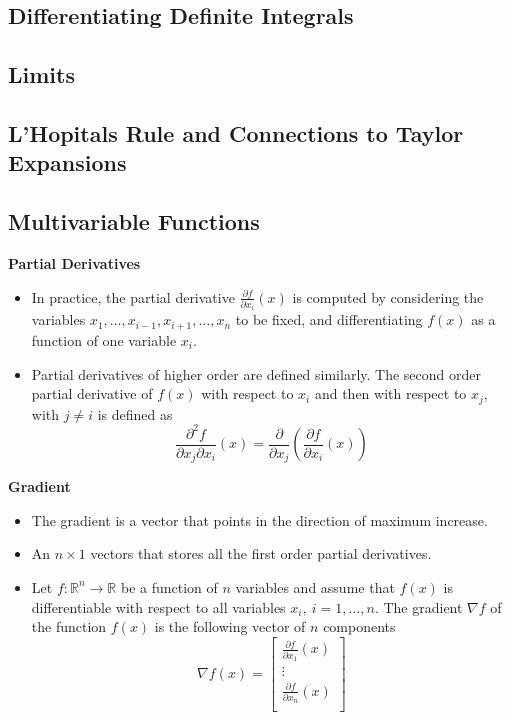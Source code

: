 \documentclass[11pt]{article}
\begin{document}
\subsection{Differentiating Definite Integrals}

\subsection{Limits}

\subsection{L'Hopitals Rule and Connections to Taylor Expansions}

\subsection{Multivariable Functions}

\textbf{Partial Derivatives}
\begin{itemize}
    \item In practice, the partial derivative $\frac{\partial f}{\partial x_i} (x)$ is computed
    by considering the variables $x_1, \ldots, x_{i-1}, x_{i+1}, \ldots, x_n$ to be fixed, and
    differentiating $f(x)$ as a function of one variable $x_i$.
    \item Partial derivatives of higher order are defined similarly. The second order partial 
    derivative of $f(x)$ with respect to $x_i$ and then with respect to $x_j$, with $j \ne i$
    is defined as
    \[ \frac{\partial^2f}{\partial x_j \partial x_i} (x) = \frac{\partial}{\partial x_j} \left(
        \frac{\partial f}{\partial x_i}(x)\right) \]
\end{itemize}

\textbf{Gradient}
\begin{itemize}
    \item The gradient is a vector that points in the direction of maximum increase.
    \item An $n \times 1$ vectors that stores all the first order partial derivatives.
    \item Let $f : \mathbb{R}^n \to \mathbb{R}$ be a function of $n$ variables and assume that 
    $f(x)$ is differentiable with respect to all variables $x_i, \ i = 1, \ldots, n$. The 
    gradient $\nabla f$ of the function $f(x)$ is the following vector of $n$ components
    \[ 
    \nabla f(x) =  
    \begin{bmatrix}
        \frac{\partial f}{\partial x_1}(x) \\
        \vdots \\
        \frac{\partial f}{\partial x_n}(x) \\
    \end{bmatrix}
    \]
\end{itemize}
\end{document}
